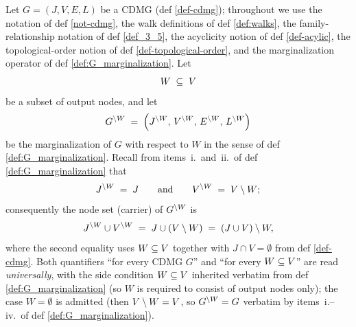 \documentclass[main]{subfiles}
\begin{document}
\def\rowref{claim\_3\_16}
\label{claim_3_16}

\begin{Rem}[MargPreservesAncestors]\label{rem:marg_preserves_ancestors_bifurcations_acyclicity}
    Let $G = (J, V, E, L)$ be a CDMG (def \ref{def-cdmg}); throughout we use the notation of def \ref{not-cdmg}, the walk definitions of def \ref{def:walks}, the family-relationship notation of def \ref{def_3_5}, the acyclicity notion of def \ref{def-acylic}, the topological-order notion of def \ref{def-topological-order}, and the marginalization operator of def \ref{def:G_marginalization}. Let
    \[
        W \;\subseteq\; V
    \]
    be a subset of output nodes, and let
    \[
        G^{\setminus W} \;=\; \left ( J^{\setminus W},\, V^{\setminus W},\, E^{\setminus W},\, L^{\setminus W} \right )
    \]
    be the marginalization of $G$ with respect to $W$ in the sense of def \ref{def:G_marginalization}. Recall from items~i.\ and~ii.\ of def \ref{def:G_marginalization} that
    \[
        J^{\setminus W} \;=\; J
        \qquad\text{and}\qquad
        V^{\setminus W} \;=\; V \setminus W;
    \]
    consequently the node set (carrier) of $G^{\setminus W}$ is
    \[
        J^{\setminus W} \cup V^{\setminus W} \;=\; J \cup (V \setminus W) \;=\; (J \cup V) \setminus W,
    \]
    where the second equality uses $W \subseteq V$ together with $J \cap V = \emptyset$ from def \ref{def-cdmg}. Both quantifiers ``for every CDMG $G$'' and ``for every $W \subseteq V$'' are read \emph{universally}, with the side condition $W \subseteq V$ inherited verbatim from def \ref{def:G_marginalization} (so $W$ is required to consist of output nodes only); the case $W = \emptyset$ is admitted (then $V \setminus W = V$, so $G^{\setminus W} = G$ verbatim by items~i.--iv.\ of def \ref{def:G_marginalization}).


\end{Rem}
\end{document}
